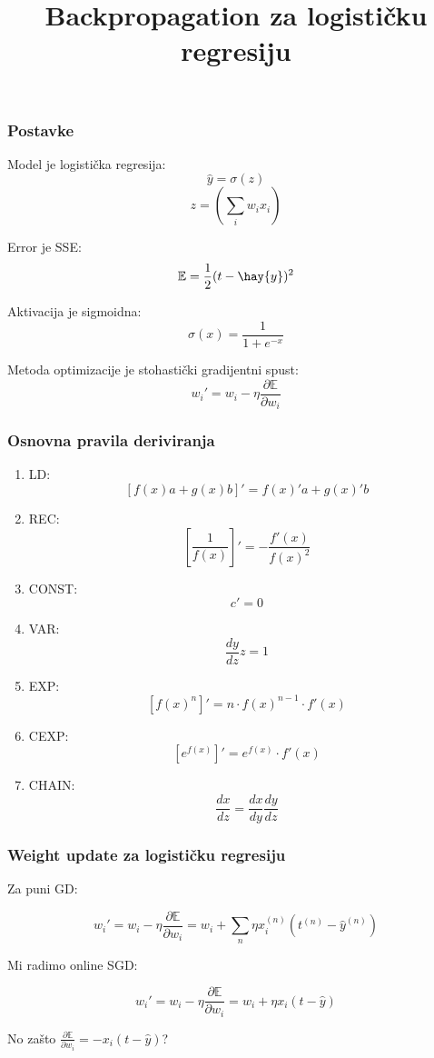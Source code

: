 \documentclass{beamer}
\title{Backpropagation za logisti\v cku regresiju}
\begin{document}
\frame{\titlepage}


\begin{frame}
\frametitle{Postavke}
    \item Model je logisti\v cka regresija: $$\hat{y}=\sigma(z)$$ $$z=(\sum_i w_ix_i)$$\pause
    \item Error je SSE: $$\mathbb{E}=\frac{1}{2} (t-\hay{y})^2$$\pause
    \item Aktivacija je sigmoidna: $$\sigma(x)=\frac{1}{1+e^{-x}}$$\pause
    \item Metoda optimizacije je stohasti\v cki gradijentni spust: $$w_i'=w_i - \eta \frac{\partial \mathbb{E}}{\partial w_i}$$ 
\end{frame}

\begin{frame}
\frametitle{Osnovna pravila deriviranja}
\begin{enumerate}
    \item LD: $$[f(x)a+g(x)b]' = f(x)'a+g(x)'b$$
    \item REC: $$[\frac{1}{f(x)}]'= - \frac{f'(x)}{f(x)^2}$$
    \item CONST: $$c'=0$$
    \item VAR: $$\frac{dy}{dz}z=1$$
    \item EXP: $$[f(x)^n]'=n\cdot f(x)^{n-1} \cdot f'(x)$$
    \item CEXP: $$[e^{f(x)}]'=e^{f(x)}\cdot f'(x)$$
    \item CHAIN: $$\frac{dx}{dz}=\frac{dx}{dy}\frac{dy}{dz}$$
    \end{enumerate}
\end{frame}



\begin{frame}
\frametitle{Weight update za logisti\v cku regresiju}

Za puni GD:

$$w_i'=w_i-\eta\frac{\partial\mathbb{E}}{\partial w_i}=w_i + \sum_n\eta x_i^{(n)}(t^{(n)}-\hat{y}^{(n)})$$ \pause

Mi radimo online SGD:

$$w_i'=w_i-\eta\frac{\partial\mathbb{E}}{\partial w_i}=w_i + \eta x_i(t-\hat{y})$$\pause

\alert{No za\v sto $\frac{\partial\mathbb{E}}{\partial w_i}= -x_i(t-\hat{y})$?}

\end{frame}
\end{document}
